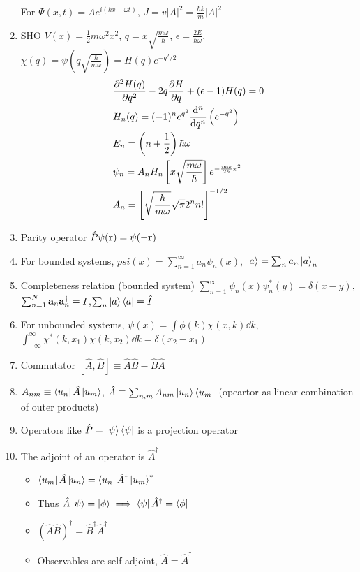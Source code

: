 \documentclass{article}
\theoremstyle{remark}
\theoremstyle{remark}
\begin{document}
\begin{enumerate}
    For $\Psi(x,t)=Ae^{i(kx-\omega t)}$, $\boxed{J=v|A|^2=\frac{\hbar k}{m}|A|^2}$
    \item SHO $V(x)=\frac{1}{2}m\omega^2 x^2$, $q=x\sqrt{\frac{m\omega}{\hbar}}$, $\epsilon=\frac{2E}{\hbar\omega}$, $\chi(q)=\psi(q\sqrt{\frac{\hbar}{m\omega}})=H(q)e^{-q^2/2}$\begin{align*}
        &\pdv[2]{H(q)}{q}-2q\pdv{H}{q}+(\epsilon-1)H(q) = 0\\
        &H_n(q)=(-1)^n e^{q^2}\dv[n]{q}\left(e^{-q^2}\right)\\
        &E_n=\left(n+\frac{1}{2}\right)\hbar\omega\\
        &\psi_n=A_n H_n\left[x\sqrt{\frac{m\omega}{\hbar}}\right]e^{-\frac{m\omega}{2\hbar}x^2}\\
        &A_n = \left[\sqrt{\frac{\hbar}{m\omega}}\sqrt{\pi}2^n n!\right]^{-1/2}
    \end{align*}
    \item Parity operator $\hat{P}\psi(\vb{r}) = \psi(-\vb{r})$
    \item For bounded systems, $psi(x)=\sum_{n=1}^{\infty}a_n\psi_n(x)$, $\ket{a}=\sum_n a_n\ket{a}_n$
    \item Completeness relation (bounded system) $\sum_{n=1}^{\infty}\psi_n(x)\psi_n^*(y)=\delta(x-y)$, $\sum_{n=1}^{N}\vb{a}_n\vb{a}_n^\dagger=I$,\allowbreak $\sum_n\ket{a}\bra{a}=\hat{I}$
    \item For unbounded systems, $\psi(x)=\int\phi(k)\chi(x,k)\dd k$, $\int_{-\infty}^\infty\chi^*(k,x_1)\chi(k,x_2)\dd k=\delta(x_2-x_1)$
    \item Commutator $\left[\hat{A},\hat{B}\right]\equiv \hat{A}\hat{B}-\hat{B}\hat{A}$
    \item $A_{nm}\equiv\bra{u_n}\hat{A}\ket{u_m}$, $\hat{A}\equiv\sum_{n,m}A_{nm}\ket{u_n}\bra{u_m}$ (opeartor as linear combination of outer products)
    \item Operators like $\hat{P}=\ket{\psi}\bra{\psi}$ is a projection operator
    \item The adjoint of an operator is $\hat{A}^\dagger$\begin{itemize}
        \item $\bra{u_m}\hat{A}\ket{u_n}=\bra{u_n}\hat{A}^\dagger\ket{u_m}^*$
        \item Thus $\hat{A}\ket{\psi}=\ket{\phi}\implies \bra{\psi}\hat{A}^\dagger=\bra{\phi}$
        \item $(\hat{A}\hat{B})^\dagger=\hat{B}^\dagger\hat{A}^\dagger$
        \item Observables are self-adjoint, $\hat{A}=\hat{A}^\dagger$

\end{itemize}
\end{enumerate}
\end{document}
